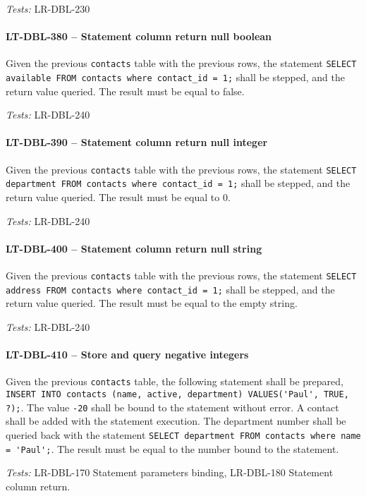 \textit{Tests: } LR-DBL-230

\paragraph{LT-DBL-380 -- Statement column return null boolean}
Given the previous \lstinline{contacts} table with the previous rows,
the statement \lstinline{SELECT available FROM contacts where contact_id = 1;}
shall be stepped, and the return value queried. The result must be equal to
false.

\textit{Tests: } LR-DBL-240

\paragraph{LT-DBL-390 -- Statement column return null integer}
Given the previous \lstinline{contacts} table with the previous rows,
the statement \lstinline{SELECT department FROM contacts where contact_id = 1;}
shall be stepped, and the return value queried. The result must be equal to
0.

\textit{Tests: } LR-DBL-240

\paragraph{LT-DBL-400 -- Statement column return null string}
Given the previous \lstinline{contacts} table with the previous rows,
the statement \lstinline{SELECT address FROM contacts where contact_id = 1;}
shall be stepped, and the return value queried. The result must be equal to
the empty string.

\textit{Tests: } LR-DBL-240

\paragraph{LT-DBL-410 -- Store and query negative integers}
Given the previous \lstinline{contacts} table,
the following statement shall be prepared,
\lstinline{INSERT INTO contacts (name, active, department) VALUES('Paul', TRUE, ?);}.
The value \lstinline{-20} shall be bound to the statement without error.
A contact shall be added with the statement execution.
The department number shall be queried back with the statement
\lstinline{SELECT department FROM contacts where name = 'Paul';}.
The result must be equal to the number bound to the statement.

\textit{Tests: } LR-DBL-170 Statement parameters binding, LR-DBL-180 Statement
column return.

